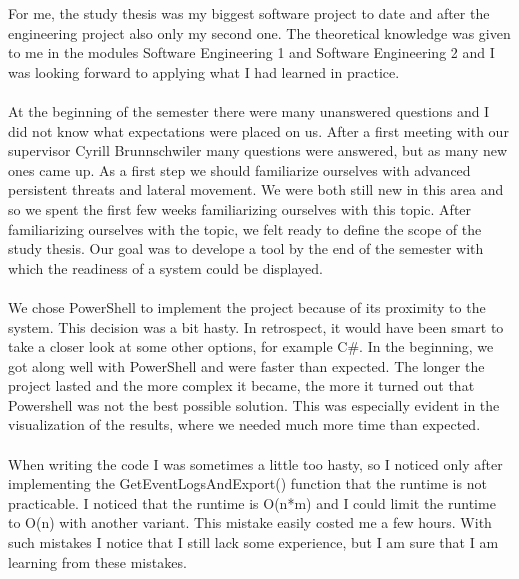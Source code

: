 \thispagestyle{plain}
\renewcommand\section{\stdsection}

For me, the study thesis was my biggest software project to date and after the engineering project also only my second one. The theoretical knowledge was given to me in the modules Software Engineering 1 and Software Engineering 2 and I was looking forward to applying what I had learned in practice. 
\\\\
At the beginning of the semester there were many unanswered questions and I did not know what expectations were placed on us. After a first meeting with our supervisor Cyrill Brunnschwiler many questions were answered, but as many new ones came up. As a first step we should familiarize ourselves with advanced persistent threats and lateral movement. We were both still new in this area and so we spent the first few weeks familiarizing ourselves with this topic. After familiarizing ourselves with the topic, we felt ready to define the scope of the study thesis. Our goal was to develope a tool by the end of the semester with which the readiness of a system could be displayed.
\\\\
We chose PowerShell to implement the project because of its proximity to the system. This decision was a bit hasty. In retrospect, it would have been smart to take a closer look at some other options, for example C\#. In the beginning, we got along well with PowerShell and were faster than expected. The longer the project lasted and the more complex it became, the more it turned out that Powershell was not the best possible solution. This was especially evident in the visualization of the results, where we needed much more time than expected.
\\\\
When writing the code I was sometimes a little too hasty, so I noticed only after implementing the GetEventLogsAndExport() function that the runtime is not practicable. I noticed that the runtime is O(n*m) and I could limit the runtime to O(n) with another variant. This mistake easily costed me a few hours. With such mistakes I notice that I still lack some experience, but I am sure that I am learning from these mistakes.
\\\\
